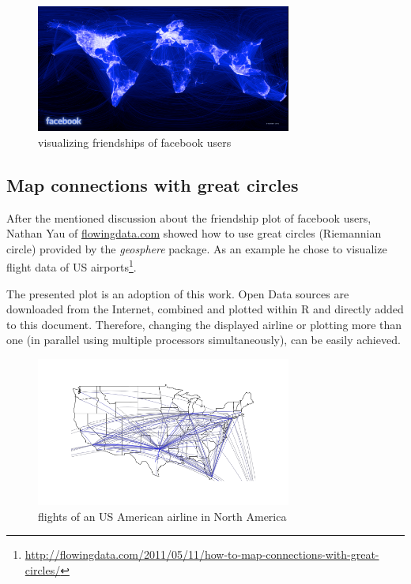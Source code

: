 \documentclass{ifacconf}
\begin{document}
\begin{figure}[h]
\begin{center}
\includegraphics[width=8.4cm]{pics/facebook.png}    %
\caption{visualizing friendships of facebook users} 
\label{fig:facebook}
\end{center}
\end{figure}

\subsection{Map connections with great circles}
After the mentioned discussion about the friendship plot of facebook users,
Nathan Yau of \url{flowingdata.com} showed how to use great circles
(Riemannian circle) provided by the \textit{geosphere} package. As an example he chose to
visualize flight data of US 
airports\footnote{\url{http://flowingdata.com/2011/05/11/how-to-map-connections-with-great-circles/}}.

The presented plot is an adoption of this work. Open Data sources are downloaded from
the Internet, combined and plotted within R and directly added to this document.
Therefore, changing the displayed airline or plotting more than one (in parallel using
multiple processors simultaneously), can be easily achieved.


\begin{figure}[h]
\begin{center}
\includegraphics[width=8.4cm]{pics/flights.png}    %
\caption{flights of an US American airline in North America} 
\label{fig:flights}
\end{center}
\end{figure}
\end{document}
